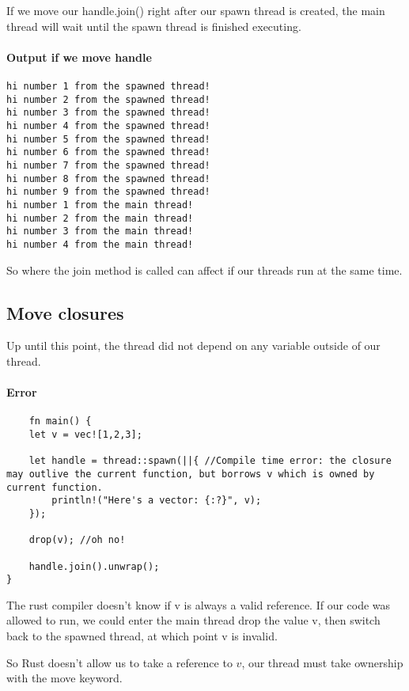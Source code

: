 If we move our handle.join() right after our spawn thread is created, the main thread will wait until the spawn thread is finished executing.
\paragraph*{Output if we move handle}\begin{lstlisting}
hi number 1 from the spawned thread!
hi number 2 from the spawned thread!
hi number 3 from the spawned thread!
hi number 4 from the spawned thread!
hi number 5 from the spawned thread!
hi number 6 from the spawned thread!
hi number 7 from the spawned thread!
hi number 8 from the spawned thread!
hi number 9 from the spawned thread!
hi number 1 from the main thread!
hi number 2 from the main thread!
hi number 3 from the main thread!
hi number 4 from the main thread!
\end{lstlisting}

So where the join method is called can affect if our threads run at the same time.

\subsection{Move closures}

Up until this point, the thread did not depend on any variable outside of our thread.

\paragraph*{Error}\begin{lstlisting}
    fn main() {
    let v = vec![1,2,3];
    
    let handle = thread::spawn(||{ //Compile time error: the closure may outlive the current function, but borrows v which is owned by current function.
        println!("Here's a vector: {:?}", v);
    });

    drop(v); //oh no!

    handle.join().unwrap();
}
\end{lstlisting}

The rust compiler doesn't know if v is always a valid reference. If our code was allowed to run, we could enter the main thread drop the value v, then switch back to the spawned thread, at which point v is invalid.

So Rust doesn't allow us to take a reference to $v$, our thread must take ownership with the move keyword.

